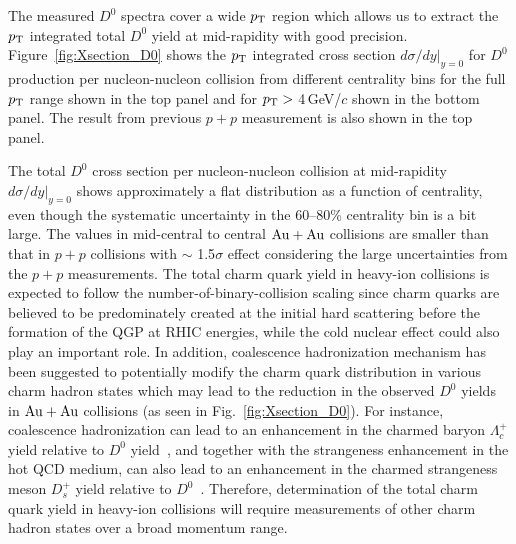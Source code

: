 \documentclass[%
 reprint,	
 amsmath,amssymb,
 aps,
 prc,
]{revtex4-1}
\begin{document}
The measured $D^0$ spectra cover a wide $p_{\rm T}$ region which allows us to extract the $p_{\rm T}$ integrated total $D^0$ yield at mid-rapidity with good precision. Figure~\ref{fig:Xsection_D0} shows the $p_{\rm T}$ integrated cross section $d\sigma/dy|_{y=0}$ for $D^0$ production per nucleon-nucleon collision from different centrality bins for the full $p_{\rm T}$ range shown in the top panel and for $p_{\rm T}>$ 4\,GeV/$c$ shown in the bottom panel. The result from previous $p + p$ measurement is also shown in the top panel.

The total $D^0$ cross section per nucleon-nucleon collision at mid-rapidity $d\sigma/dy|_{y=0}$ shows approximately a flat distribution as a function of centrality, even though the systematic uncertainty in the 60--80\% centrality bin is a bit large. The values in mid-central to central ${\rm{Au + Au}}$ collisions are smaller than that in $p + p$ collisions with $\sim$ 1.5$\sigma$ effect considering the large uncertainties from the $p + p$ measurements. The total charm quark yield in heavy-ion collisions is expected to follow the number-of-binary-collision scaling since charm quarks are believed to be predominately created at the initial hard scattering before the formation of the QGP at RHIC energies, while the cold nuclear effect could also play an important role. In addition, coalescence hadronization mechanism has been suggested to potentially modify the charm quark distribution in various charm hadron states which may lead to the reduction in the observed $D^0$ yields in ${\rm{Au + Au}}$ collisions (as seen in Fig.~\ref{fig:Xsection_D0}). For instance, coalescence hadronization can lead to an enhancement in the charmed baryon $\Lambda_{c}^+$ yield relative to $D^0$ yield~\cite{Oh2009}, and together with the strangeness enhancement in the hot QCD medium, can also lead to an enhancement in the charmed strangeness meson $D_{s}^+$ yield relative to $D^0$~\cite{He2013}. Therefore, determination of the total charm quark yield in heavy-ion collisions will require measurements of other charm hadron states over a broad momentum range.
\end{document}
